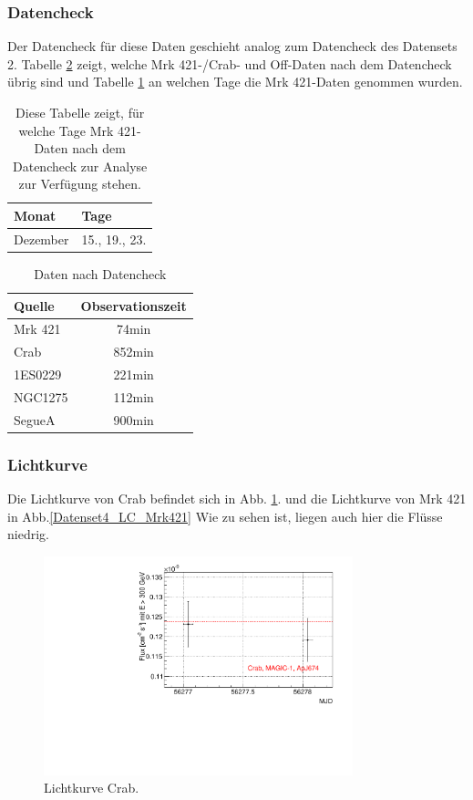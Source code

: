 \subsubsection{Datencheck}
Der Datencheck für diese Daten geschieht analog zum Datencheck des Datensets 2. 
Tabelle \ref{tab:Datenset4} zeigt, welche Mrk 421-/Crab- und Off-Daten nach dem Datencheck übrig sind und Tabelle \ref{tab:Datenset4-Mrk421} an welchen Tage die Mrk 421-Daten genommen wurden.

\begin{table}[!h]
\centering
\caption{Diese Tabelle zeigt, für welche Tage Mrk 421-Daten nach dem Datencheck zur Analyse zur Verfügung stehen.}
\label{tab:Datenset4-Mrk421}
\begin{tabular}{ll}
  \toprule
  Monat & Tage\\
  \midrule
  \midrule
Dezember & 15., 19., 23.\\
  \bottomrule
\end{tabular}
\end{table}


\begin{table}[!h]
\centering
\caption{Daten nach Datencheck}
\label{tab:Datenset4}
\begin{tabular}{lc}
  \toprule
  Quelle & Observationszeit\\
  \midrule
  \midrule
  Mrk 421 & 74min\\
  \midrule
  Crab & 852min\\
  \midrule
  1ES0229 & 221min \\
  NGC1275 & 112min \\
  SegueA & 900min  \\
  \bottomrule
  \bottomrule
\end{tabular}
\end{table}

\subsubsection{Lichtkurve}
Die Lichtkurve von Crab befindet sich in Abb. \ref{Datenset4_LC_Crab}.
und die Lichtkurve von Mrk 421 in Abb.\ref{Datenset4_LC_Mrk421} 
Wie zu sehen ist, liegen auch hier die Flüsse niedrig.

\begin{figure}
    \centering
    \includegraphics[width=0.8\textwidth]{./Plots/04_MrkAnalyse/Datenset4/Datenset4_LC_Crab.pdf}
    \caption{Lichtkurve Crab.}
    \label{Datenset4_LC_Crab}
\end{figure}

